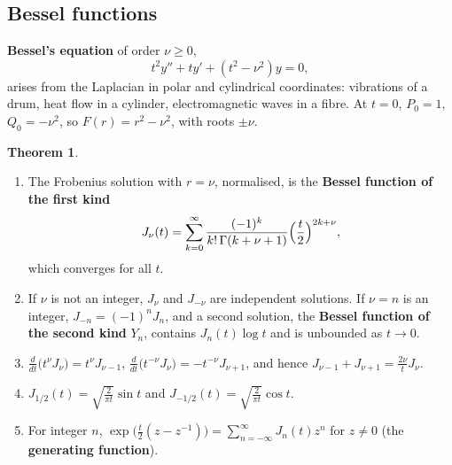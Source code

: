 \documentclass[11pt,a4paper]{article}
\numberwithin{equation}{section}
\theoremstyle{definition}
\newtheorem{thm}{Theorem}[subsection]
\begin{document}
\subsection{Bessel functions}
\label{ssec:bessel}

\textbf{Bessel's equation} of order $\nu \geq 0$,
\[
t^2y'' + ty' + (t^2 - \nu^2)y = 0 ,
\]
arises from the Laplacian in polar and cylindrical coordinates: vibrations of a drum, heat flow in a cylinder, electromagnetic waves in a fibre. At $t = 0$, $P_0 = 1$, $Q_0 = -\nu^2$, so $F(r) = r^2 - \nu^2$, with
roots $\pm\nu$.

\begin{thm}
\label{thm:bessel}
\begin{enumerate}[label=(\roman*)]
\item The Frobenius solution with $r = \nu$, normalised, is the \textbf{Bessel function of the first kind}
\[
J_\nu(t) = \sum_{k=0}^\infty\frac{(-1)^k}{k!\,\Gamma(k + \nu + 1)}\Bigl(\frac t2\Bigr)^{2k+\nu} ,
\]
which converges for all $t$.
\item If $\nu$ is not an integer, $J_\nu$ and $J_{-\nu}$ are independent solutions. If $\nu = n$ is an integer, $J_{-n} = (-1)^nJ_n$, and a second solution, the \textbf{Bessel function of the second kind} $Y_n$,
contains $J_n(t)\log t$ and is unbounded as $t \to 0$.
\item $\frac{d}{dt}\bigl(t^\nu J_\nu\bigr) = t^\nu J_{\nu-1}$, $\frac{d}{dt}\bigl(t^{-\nu}J_\nu\bigr) = -t^{-\nu}J_{\nu+1}$, and hence $J_{\nu-1} + J_{\nu+1} = \frac{2\nu}{t}J_\nu$.
\item $J_{1/2}(t) = \sqrt{\frac{2}{\pi t}}\sin t$ and $J_{-1/2}(t) = \sqrt{\frac{2}{\pi t}}\cos t$.
\item For integer $n$, $\exp\bigl(\frac t2(z - z^{-1})\bigr) = \sum_{n=-\infty}^\infty J_n(t)z^n$ for $z \neq 0$ (the \textbf{generating function}).
\end{enumerate}
\end{thm}
\end{document}
